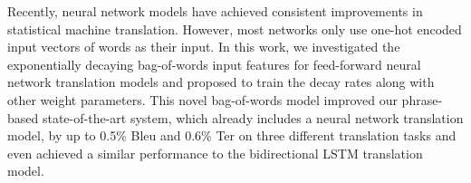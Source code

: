 Recently, neural network models have achieved consistent improvements in statistical machine translation. However, most networks only use one-hot encoded input vectors of words as their input. In this work, we investigated the exponentially decaying bag-of-words input features for feed-forward neural network translation models and proposed to train the decay rates along with other weight parameters. This novel bag-of-words model improved our phrase-based state-of-the-art system, which already includes a neural network translation model, by up to 0.5\% Bleu and 0.6\% Ter on three different translation tasks and even achieved a similar performance to the bidirectional LSTM translation model.
